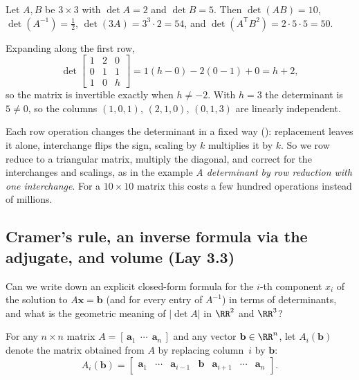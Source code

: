 \documentclass[10pt]{scrartcl}
\newcommand{\vv}[1]{\mathbf{#1}}
\begin{document}
\begin{example*}
Let $A,B$ be $3\times3$ with $\det A=2$ and $\det B=5$. Then $\det(AB)=10$, $\det(A^{-1})=\tfrac12$, $\det(3A)=3^3\cdot2=54$, and $\det(A^{\mathsf T}B^2)=2\cdot5\cdot5=50$.
\end{example*}

\begin{example*}
Expanding along the first row,
\[
  \det\begin{bmatrix}1&2&0\\0&1&1\\1&0&h\end{bmatrix}=1(h-0)-2(0-1)+0=h+2,
\]
so the matrix is invertible exactly when $h\ne-2$. With $h=3$ the determinant is $5\ne0$, so the columns $(1,0,1)$, $(2,1,0)$, $(0,1,3)$ are linearly independent.
\end{example*}

\revisit
Each row operation changes the determinant in a fixed way (): replacement leaves it alone, interchange flips the sign, scaling by $k$ multiplies it by $k$. So we row reduce to a triangular matrix, multiply the diagonal, and correct for the interchanges and scalings, as in the example \emph{A determinant by row reduction with one interchange}. For a $10\times10$ matrix this costs a few hundred operations instead of millions.

\subsection{Cramer's rule, an inverse formula via the adjugate, and volume (Lay 3.3)}

\begin{qbox}
  Can we write down an explicit closed-form formula for the $i$-th component $x_i$ of the solution to $A\vv x=\vv b$ (and for every entry of $A^{-1}$) in terms of determinants, and what is the geometric meaning of $|\det A|$ in $\RR^2$ and $\RR^3$?
\end{qbox}

For any $n\times n$ matrix $A=[\,\vv a_1\ \ \cdots\ \ \vv a_n\,]$ and any vector $\vv b\in\RR^n$, let $A_i(\vv b)$ denote the matrix obtained from $A$ by replacing column~$i$ by $\vv b$:
\[
  A_i(\vv b) = \begin{bmatrix} \vv a_1 & \cdots & \vv a_{i-1} & \vv b & \vv a_{i+1} & \cdots & \vv a_n \end{bmatrix}.
\]
\end{document}
